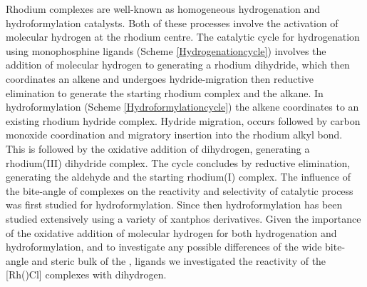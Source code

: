 Rhodium complexes are well-known as homogeneous hydrogenation and hydroformylation catalysts.  Both of these processes involve the activation of molecular hydrogen at the rhodium centre.  The catalytic cycle for hydrogenation using monophosphine ligands (Scheme \ref{Hydrogenationcycle}) involves the addition of molecular hydrogen to \ce{[Rh(PR3)2Cl]} generating a rhodium dihydride, which then coordinates an alkene and undergoes hydride-migration then reductive elimination to generate the starting rhodium complex and the alkane. In hydroformylation (Scheme \ref{Hydroformylationcycle}) the alkene coordinates to an existing rhodium hydride complex.  Hydride migration, occurs followed by carbon monoxide coordination and migratory insertion into the rhodium alkyl bond.  This is followed by the oxidative addition of dihydrogen, generating a rhodium(III) dihydride complex.  The cycle concludes by reductive elimination, generating the aldehyde and the starting rhodium(I) complex.  The influence of the bite-angle of \Phxantphos{} complexes on the reactivity and selectivity of catalytic process was first studied for hydroformylation.\cite{Kranenburg1995}  Since then hydroformylation has been studied extensively using a variety of xantphos derivatives.\cite{Bronger2002, Bronger2003, Bronger2004, Bronger2004b, Bronger2004c, Buhling1997, Buhling1997b, Dieleman2001, Dierkes1999, Freixa2003, Goedheijt1998b, Kamer2001, Leclercq2005, Leeuwen1999, Leeuwen2000, Mora2007, Sandee1999, Silva2003, Veen1999, Veen2000, Vlugt2004, Zuidema2007, Zuidema2008, Zuidema2010}  Given the importance of the oxidative addition of molecular hydrogen for both hydrogenation and hydroformylation, and to investigate any possible differences of the wide bite-angle and steric bulk of the \tBuxantphos{}, ligands we investigated the reactivity of the [Rh(\tBuxantphosk)Cl] complexes with dihydrogen.  

